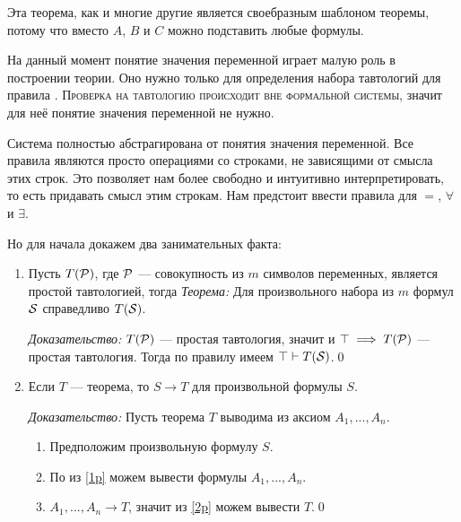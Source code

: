 Эта теорема, как и многие другие является своебразным шаблоном теоремы,
потому что вместо $A$, $B$ и $C$ можно подставить любые формулы.

На данный момент понятие значения переменной играет малую роль в построении теории.
Оно нужно только для определения набора тавтологий для правила \taut{}.
\textsc{Проверка на тавтологию
	происходит вне формальной системы}, значит для неё понятие значения переменной
не нужно.

% 

Система полностью абстрагирована от понятия значения переменной.
Все правила являются просто операциями со строками, не зависящими от смысла
этих строк. Это позволяет нам более свободно и интуитивно интерпретировать, то
есть придавать смысл этим строкам.
Нам предстоит ввести правила для $=$, $\forall$ и $\exists$.

Но для начала докажем два занимательных факта:

\begin{enumerate}
	\item{}
	Пусть $T(\mathcal P)$, где $\mathcal P$ --- совокупность из $m$ символов переменных,
	является простой тавтологией, тогда
	{\it Теорема:} Для произвольного набора из $m$ формул $\mathcal S$ справедливо $T(\mathcal S)$.

		{\it Доказательство:}
	$T(\mathcal P)$ --- простая тавтология, значит и
	${\top\implies T(\mathcal P)}$ --- простая тавтология. Тогда по правилу \taut{} имеем
	$\top\vdash T(\mathcal S)$.\qed

	\item{}Если $T$ --- теорема, то $S\to T$ для произвольной формулы $S$.

		{\it Доказательство:}
	Пусть теорема $T$ выводима из аксиом $A_1,...,A_{n}$.
	\begin{enumerate}[label=(\roman*)]
		\item{}\label{1p}Предположим произвольную формулу $S$.
		\item{}\label{2p}По \axiom{} из \ref{1p} можем вывести
		формулы $A_1,...,A_{n}$.
		\item{}\label{3p}$A_1,...,A_{n}\to T$, значит из \ref{2p} можем вывести $T$.\qed
	\end{enumerate}
\end{enumerate}

